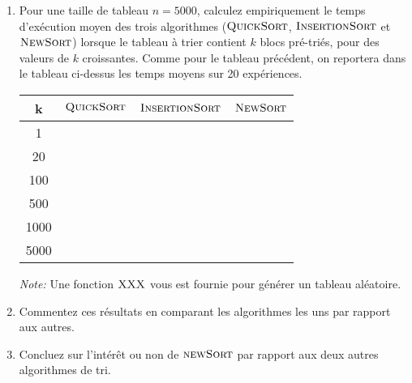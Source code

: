 \documentclass[a4paper,10pt]{article}
\begin{document}
\begin{enumerate}
\item Pour une taille de tableau $n=5000$, calculez empiriquement le temps
d'exécution moyen des trois algorithmes ($\textnormal{\scshape QuickSort}$,
$\textnormal{\scshape InsertionSort}$ et $\textnormal{\scshape NewSort}$) lorsque le tableau à trier
contient $k$ blocs pré-triés, pour des valeurs de $k$
croissantes. Comme pour le tableau précédent, on reportera dans le
tableau ci-dessus les temps moyens sur 20 expériences.

\begin{center}
\begin{tabular}{cccc}
	\hline
	k & $\textnormal{\scshape QuickSort}$ & $\textnormal{\scshape InsertionSort}$ & $\textnormal{\scshape NewSort}$ \\
	\hline
	1 & & &  \\
	20 & & &\\
	100 & & &\\
	500 & & &\\
	1000 & & &\\
	5000 & & &\\
\end{tabular}
\end{center}

{\em Note:} Une fonction $\textnormal{\scshape XXX}$ vous est fournie pour générer un tableau aléatoire.

\item Commentez ces résultats en comparant les algorithmes les uns par rapport aux autres.
\item Concluez sur l'intérêt ou non de $\textnormal{\scshape newSort}$ par rapport aux deux autres algorithmes de tri.

\end{enumerate}
\end{document}
